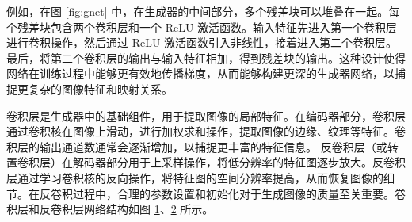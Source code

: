 例如，在图 \ref{fig:gnet} 中，在生成器的中间部分，多个残差块可以堆叠在一起。每个残差块包含两个卷积层和一个 ReLU 激活函数。输入特征先进入第一个卷积层进行卷积操作，然后通过 ReLU 激活函数引入非线性，接着进入第二个卷积层。最后，将第二个卷积层的输出与输入特征相加，得到残差块的输出。这种设计使得网络在训练过程中能够更有效地传播梯度，从而能够构建更深的生成器网络，以捕捉更复杂的图像特征和映射关系。


\begin{figure}[htb]
    \centering
    \captionsetup{font=footnotesize}
    \label{fig:conv_detail}
\end{figure}

\begin{figure}[htb]
    \centering
    \captionsetup{font=footnotesize}
    \label{fig:convtranspose}
\end{figure}

卷积层是生成器中的基础组件，用于提取图像的局部特征。在编码器部分，卷积层通过卷积核在图像上滑动，进行加权求和操作，提取图像的边缘、纹理等特征。卷积层的输出通道数通常会逐渐增加，以捕捉更丰富的特征信息。
反卷积层（或转置卷积层）在解码器部分用于上采样操作，将低分辨率的特征图逐步放大。反卷积层通过学习卷积核的反向操作，将特征图的空间分辨率提高，从而恢复图像的细节。在反卷积过程中，合理的参数设置和初始化对于生成图像的质量至关重要。卷积层和反卷积层网络结构如图 \ref{fig:conv_detail}、\ref{fig:convtranspose} 所示。


